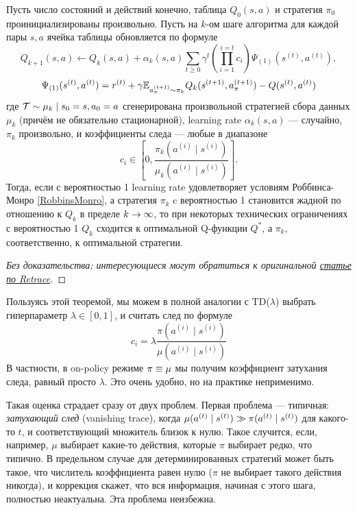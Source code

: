 \begin{theorem}[Retrace]
Пусть число состояний и действий конечно, таблица $Q_0(s, a)$ и стратегия $\pi_0$ проинициализированы произвольно. Пусть на $k$-ом шаге алгоритма для каждой пары $s, a$ ячейка таблицы обновляется по формуле
$$Q_{k+1}(s, a) \leftarrow Q_k(s, a) + \alpha_k(s, a)
\sum_{t \ge 0} \gamma^t \left( \prod_{i = 1}^{i = t}  c_{i} \right) \Psi_{(1)}(s^{(t)}, a^{(t)}),$$
$$\Psi_{(1)}(s^{(t)}, a^{(t)}) = r^{(t)} + \gamma \mathbb{E}_{a^{(t+1)}_\pi \sim \pi_k} Q_k(s^{(t+1)}, a^{(t+1)}_\pi) - Q(s^{(t)}, a^{(t)})$$
где $\Traj \HM\sim \mu_k \HM\mid s_0 \HM= s, a_0 \HM= a$ сгенерирована произвольной стратегией сбора данных $\mu_k$ (причём не обязательно стационарной), learning rate $\alpha_k(s, a)$ --- случайно, $\pi_k$ произвольно, и коэффициенты следа --- любые в диапазоне
$$c_i \in \left[ 0, \frac{\pi_k(a^{(i)} \mid s^{(i)}) }{\mu_k(a^{(i)} \mid s^{(i)})} \right].$$
Тогда, если с вероятностью 1 learning rate удовлетворяет условиям Роббинса-Монро \eqref{RobbinsMonro}, а стратегия $\pi_k$ c вероятностью 1 становится жадной по отношению к $Q_k$ в пределе $k \HM\to \infty$, то при некоторых технических ограничениях с вероятностью 1 $Q_k$ сходится к оптимальной Q-функции $Q^*$, а $\pi_k$, соответственно, к оптимальной стратегии.
\begin{proof}[Без доказательства; интересующиеся могут обратиться к оригинальной \href{https://arxiv.org/abs/1606.02647}{статье по Retrace}]
\end{proof}
\end{theorem}

Пользуясь этой теоремой, мы можем в полной аналогии с TD($\lambda$) выбрать гиперпараметр $\lambda \in [0, 1]$, и считать след по формуле
$$
    c_i = \lambda \frac{\pi(a^{(i)} \mid s^{(i)}) }{\mu(a^{(i)} \mid s^{(i)})}
$$
В частности, в on-policy режиме $\pi \HM \equiv \mu$ мы получим коэффициент затухания следа, равный просто $\lambda$. Это очень удобно, но на практике неприменимо.

Такая оценка страдает сразу от двух проблем. Первая проблема --- типичная: \emph{затухающий след} (vanishing trace), когда $\mu(a^{(t)} \mid s^{(t)}) \HM\gg \pi(a^{(t)} \mid s^{(t)})$ для какого-то $t$, и соответствующий множитель близок к нулю. Такое случится, если, например, $\mu$ выбирает какие-то действия, которые $\pi$ выбирает редко, что типично. В предельном случае для детерминированных стратегий может быть такое, что числитель коэффициента равен нулю ($\pi$ не выбирает такого действия никогда), и коррекция скажет, что вся информация, начиная с этого шага, полностью неактуальна. Эта проблема неизбежна.

